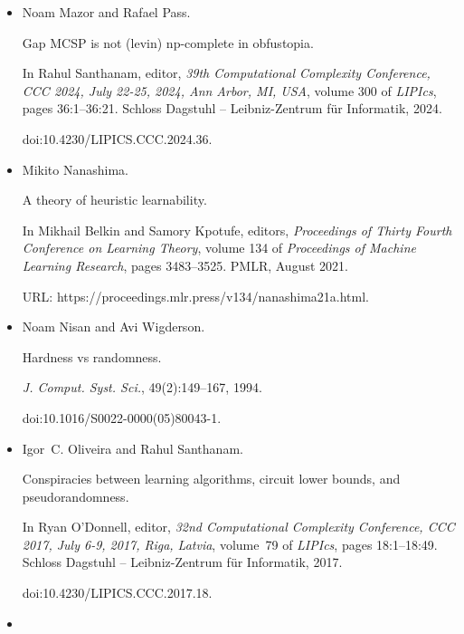 \begin{itemize}
\item[] 
[38]

Noam Mazor and Rafael Pass.


Gap MCSP is not (levin) np-complete in obfustopia.


In Rahul Santhanam, editor, \emph{39th Computational Complexity
Conference, CCC 2024, July 22-25, 2024, Ann Arbor, MI, USA}, volume 300
of \emph{LIPIcs}, pages 36:1–36:21. Schloss Dagstuhl – Leibniz-Zentrum
für Informatik, 2024.


doi:10.4230/LIPICS.CCC.2024.36.





\item[] 
[39]

Mikito Nanashima.


A theory of heuristic learnability.


In Mikhail Belkin and Samory Kpotufe, editors, \emph{Proceedings of
Thirty Fourth Conference on Learning Theory}, volume 134 of \emph{Proceedings
of Machine Learning Research}, pages 3483–3525. PMLR, August 2021.


URL: https://proceedings.mlr.press/v134/nanashima21a.html.





\item[] 
[40]

Noam Nisan and Avi Wigderson.


Hardness vs randomness.


\emph{J. Comput. Syst. Sci.}, 49(2):149–167, 1994.


doi:10.1016/S0022-0000(05)80043-1.





\item[] 
[41]

Igor C. Oliveira and Rahul Santhanam.


Conspiracies between learning algorithms, circuit lower bounds, and
pseudorandomness.


In Ryan O’Donnell, editor, \emph{32nd Computational Complexity
Conference, CCC 2017, July 6-9, 2017, Riga, Latvia}, volume 79 of \emph{LIPIcs}, pages 18:1–18:49. Schloss Dagstuhl – Leibniz-Zentrum für
Informatik, 2017.


doi:10.4230/LIPICS.CCC.2017.18.





\item[] 
[42]


\end{itemize}
